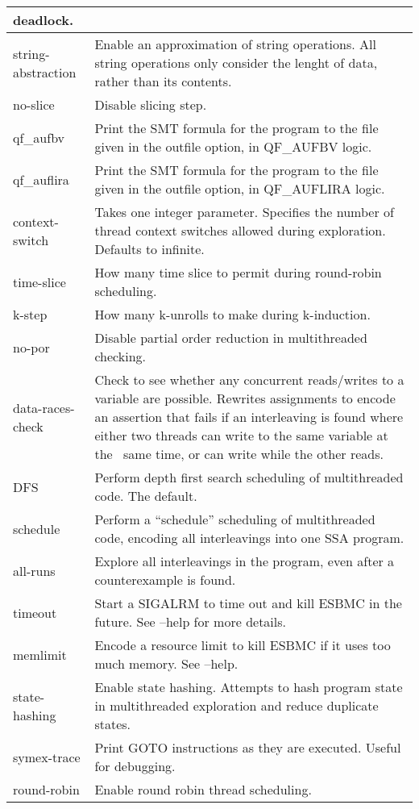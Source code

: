 \documentclass{article}
\begin{document}
\begin{longtable}{| p{} | p{} |}
deadlock.\\
\hline
string-abstraction & Enable an approximation of string operations. All string
operations only consider the lenght of data, rather than its contents.\\
\hline
no-slice & Disable slicing step.\\
\hline
qf\_aufbv & Print the SMT formula for the program to the file given in the
outfile option, in QF\_AUFBV logic.\\
\hline
qf\_auflira & Print the SMT formula for the program to the file given in the
outfile option, in QF\_AUFLIRA logic.\\
\hline
context-switch & Takes one integer parameter. Specifies the number of thread
context switches allowed during exploration. Defaults to infinite.\\
\hline
time-slice & How many time slice to permit during round-robin scheduling.\\
\hline
k-step & How many k-unrolls to make during k-induction.\\
\hline
no-por & Disable partial order reduction in multithreaded checking.\\
\hline
data-races-check & Check to see whether any concurrent reads/writes to a
variable are possible. Rewrites assignments to encode an assertion that fails
if an interleaving is found where either two threads can write to the same
variable at the ~same time, or can write while the other reads.\\
\hline
DFS & Perform depth first search scheduling of multithreaded code. The
default.\\
\hline
schedule & Perform a ``schedule'' scheduling of multithreaded code, encoding
all interleavings into one SSA program.\\
\hline
all-runs & Explore all interleavings in the program, even after a counterexample
is found.\\
\hline
timeout & Start a SIGALRM to time out and kill ESBMC in the future. See --help
for more details.\\
\hline
memlimit & Encode a resource limit to kill ESBMC if it uses too much memory.
See --help.\\
\hline
state-hashing & Enable state hashing. Attempts to hash program state in
multithreaded exploration and reduce duplicate states.\\
\hline
symex-trace & Print GOTO instructions as they are executed. Useful for
debugging.\\
\hline
round-robin & Enable round robin thread scheduling.\\

\end{longtable}
\end{document}
